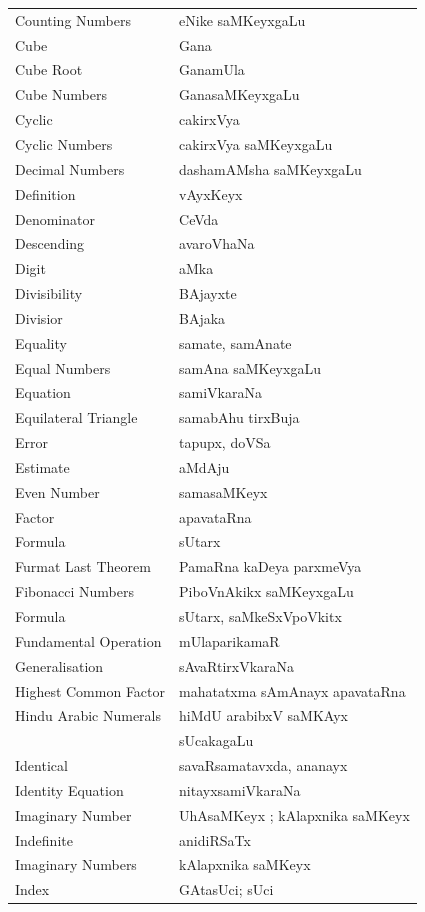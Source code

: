 \begin{longtable}{>{\rm}l@{\hspace{2cm}}l}
Counting Numbers & eNike saMKeyxgaLu\\
Cube & Gana\\
Cube Root & GanamUla\\
Cube Numbers & GanasaMKeyxgaLu\\
Cyclic & cakirxVya\\
Cyclic Numbers & cakirxVya saMKeyxgaLu\\
Decimal Numbers & dashamAMsha saMKeyxgaLu\\
Definition & vAyxKeyx\\
Denominator & CeVda\\
Descending & avaroVhaNa\\
Digit & aMka\\
Divisibility & BAjayxte\\
Divisior & BAjaka\\
Equality & samate, samAnate\\
Equal Numbers & samAna saMKeyxgaLu\\
Equation & samiVkaraNa\\
Equilateral Triangle & samabAhu tirxBuja\\
Error & tapupx, doVSa\\
Estimate & aMdAju\\
Even Number & samasaMKeyx\\
Factor & apavataRna\\
Formula & sUtarx\\
Furmat Last Theorem & PamaRna kaDeya parxmeVya\\
Fibonacci Numbers & PiboVnAkikx saMKeyxgaLu\\
Formula & sUtarx, saMkeSxVpoVkitx\\
Fundamental Operation & mUlaparikamaR\\
Generalisation & sAvaRtirxVkaraNa\\
Highest Common Factor & mahatatxma sAmAnayx apavataRna\\
Hindu Arabic Numerals & hiMdU arabibxV saMKAyx\\
                      & sUcakagaLu\\
Identical & savaRsamatavxda, ananayx\\
Identity Equation & nitayxsamiVkaraNa\\
Imaginary Number & UhAsaMKeyx ; kAlapxnika saMKeyx\\
Indefinite & anidiRSaTx\\
Imaginary Numbers & kAlapxnika saMKeyx\\
Index & GAtasUci; sUci\\

\end{longtable}
